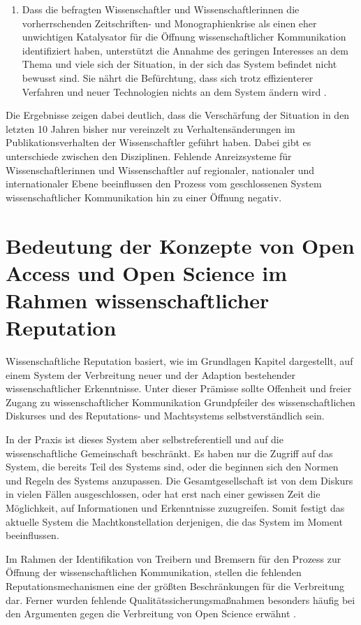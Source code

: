 \begin{enumerate}
\item Dass die befragten Wissenschaftler und Wissenschaftlerinnen die vorherrschenden Zeitschriften- und Monographienkrise als einen eher unwichtigen Katalysator für die Öffnung wissenschaftlicher Kommunikation identifiziert haben, unterstützt die Annahme des geringen Interesses an dem Thema und viele sich der Situation, in der sich das System befindet nicht bewusst sind. Sie nährt die Befürchtung, dass sich trotz effizienterer Verfahren und neuer Technologien nichts an dem System ändern wird \cite{Parks_2002_acadamic_faust}.
\end{enumerate}

Die Ergebnisse zeigen dabei deutlich, dass die Verschärfung der Situation in den letzten 10 Jahren bisher nur vereinzelt zu Verhaltensänderungen im Publikationsverhalten der Wissenschaftler geführt haben. Dabei gibt es unterschiede zwischen den Disziplinen. Fehlende Anreizsysteme für Wissenschaftlerinnen und Wissenschaftler auf regionaler, nationaler und internationaler Ebene beeinflussen den Prozess vom geschlossenen System wissenschaftlicher Kommunikation hin zu einer Öffnung negativ.

\section{Bedeutung der Konzepte von Open Access und Open Science im Rahmen wissenschaftlicher Reputation}

Wissenschaftliche Reputation basiert, wie im Grundlagen Kapitel dargestellt, auf einem System der Verbreitung neuer und der Adaption bestehender wissenschaftlicher Erkenntnisse. Unter dieser Prämisse sollte Offenheit und freier Zugang zu wissenschaftlicher Kommunikation Grundpfeiler des wissenschaftlichen Diskurses und des Reputations- und Machtsystems selbstverständlich sein.

In der Praxis ist dieses System aber selbstreferentiell und auf die wissenschaftliche Gemeinschaft beschränkt. Es haben nur die Zugriff auf das System, die bereits Teil des Systems sind, oder die beginnen sich den Normen und Regeln des Systems anzupassen. Die Gesamtgesellschaft ist von dem Diskurs in vielen Fällen ausgeschlossen, oder hat erst nach einer gewissen Zeit die Möglichkeit, auf Informationen und Erkenntnisse zuzugreifen. Somit festigt das aktuelle System die Machtkonstellation derjenigen, die das System im Moment beeinflussen.

Im Rahmen der Identifikation von Treibern und Bremsern für den Prozess zur Öffnung der wissenschaftlichen Kommunikation, stellen die fehlenden Reputationsmechanismen eine der größten Beschränkungen für die Verbreitung dar. Ferner wurden fehlende Qualitätssicherungsmaßnahmen besonders häufig bei den Argumenten gegen die Verbreitung von Open Science erwähnt \cite{eu_open_science_2015}.

